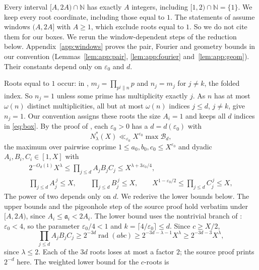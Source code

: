 \documentclass{amsart}
\theoremstyle{definition}
\theoremstyle{plain}
\numberwithin{equation}{section}
\numberwithin{table}{section}
\newcommand{\rad}{\operatorname{rad}}
\newcommand{\N}{\mathbb{N}}
\begin{document}
Every interval $[A,2A)\cap\N$ has exactly $A$ integers, including
$[1,2)\cap\N=\{1\}$. We keep every root coordinate, including those equal to
$1$. The statements of \cite[Propositions~2.3, 3.1 and~4.1]{BBLT} assume
windows $(A,2A]$ with $A\ge1$, which exclude roots equal to $1$. So we do not
cite them for our boxes. We rerun the window-dependent steps of the reduction
below.
Appendix~\ref{app:windows} proves the pair, Fourier and geometry bounds in our
convention (Lemmas~\ref{lem:app:pair}, \ref{lem:app:fourier}
and~\ref{lem:app:geom}). Their constants depend only on $\varepsilon_0$
and $d$.

Roots equal to $1$ occur: in
\cite[Lemma~2.2]{BBLT}, $m_j=\prod_{p^{j}\|n}p$ and $n_j=m_j$ for $j\ne k$, the
folded index. So $n_j=1$ unless some prime has multiplicity exactly $j$. As
$n$ has at most $\omega(n)$ distinct multiplicities, all but at most
$\omega(n)$ indices $j\le d$, $j\ne k$, give $n_j=1$. Our convention assigns
these roots the size $A_i=1$ and keeps all $d$ indices in \eqref{eq:box}.
By the proof of \cite[Proposition~2.1]{BBLT}, each $\varepsilon_0>0$ has a
$d=d(\varepsilon_0)$ with
\begin{equation}\label{eq:reduction}
 N^*_\lambda(X)\ll_{\varepsilon_0}X^{\varepsilon_0}\max \mathcal B_d,
\end{equation}
the maximum over pairwise coprime $1\le a_0,b_0,c_0\le X^{\varepsilon_0}$ and
dyadic $A_i,B_i,C_i\in[1,X]$ with
\begin{equation}\label{eq:boxconstraints}
 \begin{gathered}
  2^{-O_d(1)}X^{\lambda}\le\prod_{j\le d}A_jB_jC_j\le X^{\lambda+3\varepsilon_0/4},\\
  \prod_{j\le d}A_j^{\,j}\le X,\qquad
  \prod_{j\le d}B_j^{\,j}\le X,\qquad
 X^{1-\varepsilon_0/2}\le\prod_{j\le d}C_j^{\,j}\le X ,
 \end{gathered}
\end{equation}
The power of two depends only on $d$. We rederive the lower bounds
below. The upper bounds and the pigeonhole step of the source proof hold
verbatim under $[A,2A)$, since $A_i\le\mathfrak a_i<2A_i$. The lower bound uses the
nontrivial branch of \cite[Lemma~2.2]{BBLT}: $\varepsilon_0<4$, so the
parameter $\varepsilon_0/4<1$ and $k=\lceil4/\varepsilon_0\rceil\le d$.
Since $c\ge X/2$,
\[
 \prod_{j\le d}A_jB_jC_j\ge2^{-3d}\rad(abc)
 \ge2^{-3d-\lambda-1}X^\lambda\ge2^{-3d-3}X^\lambda,
\]
since $\lambda\le2$. Each of the $3d$ roots loses at most a factor $2$; the
source proof prints $2^{-d}$ here. The weighted lower bound for the $c$-roots is
\end{document}
